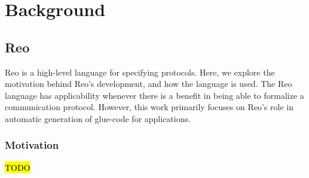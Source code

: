 
\chapter{Background}
\label{sec:background}
\section{Reo}
\label{sec:reo_background}
Reo is a high-level language for specifying protocols. Here, we explore the motivation behind Reo's development, and how the language is used.
The Reo language has applicability whenever there is a benefit in being able to formalize a communication protocol. However, this work primarily focuses on Reo's role in automatic generation of glue-code for applications.  

\subsection{Motivation}
\label{sec:reo_motivation}

\hl{TODO}
%
%

